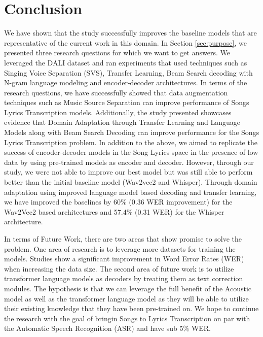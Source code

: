 
\chapter{Conclusion}%
\label{sec:conclusion}

We have shown that the study successfully improves the baseline models that are representative of the current work in this domain. In Section \ref{sec:purpose}, we presented three research questions for which we want to get answers. We leveraged the DALI dataset and ran experiments that used techniques such as Singing Voice Separation (SVS), Transfer Learning, Beam Search decoding with N-gram language modeling and encoder-decoder architectures. In terms of the research questions, we have successfully showed that data augmentation techniques such as Music Source Separation can improve performance of Songs Lyrics Transcription models. Additionally, the study presented showcases evidence that Domain Adaptation through Transfer Learning and Language Models along with Beam Search Decoding can improve performance for the Songs Lyrics Transcription problem. In addition to the above, we aimed to replicate the success of encoder-decoder models in the Song Lyrics space in the presence of low data by using pre-trained models as encoder and decoder. However, through our study, we were not able to improve our best model but was still able to perform better than the initial baseline model (Wav2vec2 and Whisper). Through domain adaptation using improved language model based decoding and transfer learning, we have improved the baselines by 60\% (0.36 WER improvement) for the Wav2Vec2 based architectures and 57.4\% (0.31 WER) for the Whisper architecture.


In terms of Future Work, there are two areas that show promise to solve the problem. One area of research is to leverage more datasets for training the models. Studies \cite{radford2023robust} \cite{xu2021self} \cite{ou2022transfer} show a significant improvement in Word Error Rates (WER) when increasing the data size. The second area of future work is to utilize transformer language models as decoders by treating them as text correction modules. The hypothesis is that we can leverage the full benefit of the Acoustic model as well as the transformer language model as they will be able to utilize their existing knowledge that they have been pre-trained on. We hope to continue the research with the goal of bringin Songs to Lyrics Transcription on par with the Automatic Speech Recognition (ASR) and have sub 5\% WER.